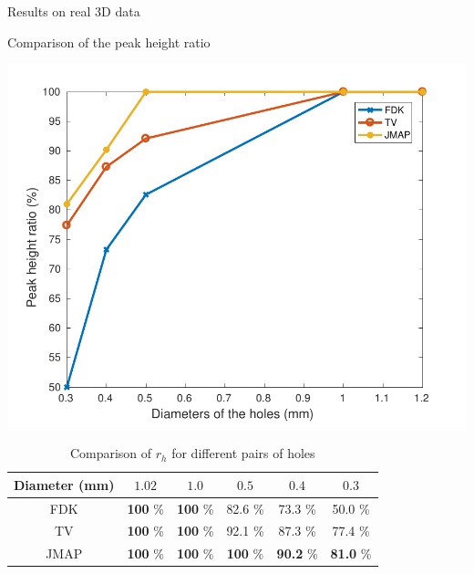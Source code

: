 \documentclass[latex]{beamer}
\begin{document}
\begin{frame}{Results on real 3D data}
\begin{block}{Comparison of the peak height ratio}
\begin{minipage}[htb]{\linewidth}
\centering
\includegraphics[scale=0.38]{PeakHeightRatio}
\end{minipage} \vfill
\begin{minipage}[htb]{\linewidth}
\begin{table}[htb]
\begin{center}
\begin{tabular}{|*{6}{c|}}
\hline
\textbf{Diameter (mm)} & $1.02$ & $1.0$ & $0.5$ & $0.4$ & $0.3$ \\
\hline
FDK & \textbf{100} \% & \textbf{100} \% & 82.6 \% & 73.3 \% & 50.0 \% \\
\hline
TV & \textbf{100} \% & \textbf{100} \% & 92.1 \% & 87.3 \% & 77.4 \% \\
\hline
JMAP & \textbf{100} \% & \textbf{100} \% & \textbf{100} \% & \textbf{90.2} \% & \textbf{81.0} \% \\
\hline
\end{tabular}
\end{center}
\caption{Comparison of $r_h$ for different pairs of holes}
\end{table} 
\end{minipage}
\end{block}
\end{frame}
\end{document}

